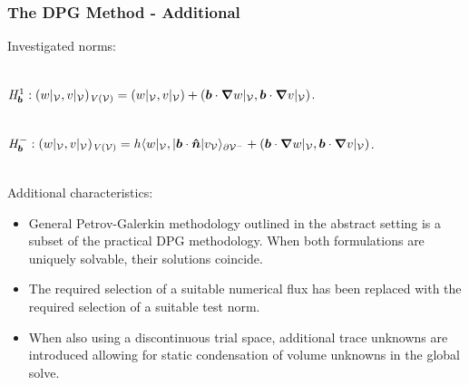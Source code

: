 \begin{frame}
\frametitle{The DPG Method - Additional}

Investigated norms:
\\~

$\fspace{H}^1_\varv{b}: (w|_{\fe{V}},v|_{\fe{V}})_{\fspace{V}(\fe{V})}
  = (w|_{\fe{V}},v|_{\fe{V}}) +(\varv{b} \cdot \nabla w|_{\fe{V}},\varv{b} \cdot \nabla v|_{\fe{V}})$.
\\~

$\fspace{H}^-_\varv{b}: (w|_{\fe{V}},v|_{\fe{V}})_{\fspace{V}(\fe{V})} =
  h \langle w|_{\fe{V}},|\varv{b} \cdot \varv{\hat{n}}| v_{\fe{V}} \rangle_{\partial \fe{V}^-} +(\varv{b} \cdot \nabla w|_{\fe{V}},\varv{b} \cdot \nabla v|_{\fe{V}})$.
\\~

Additional characteristics:
\begin{itemize}
  \item General Petrov-Galerkin methodology outlined in the abstract setting is
    a subset of the practical DPG methodology. When both formulations are
    uniquely solvable, their solutions coincide.
  \item The required selection of a suitable numerical flux has been replaced
    with the required selection of a suitable test norm.
  \item When also using a discontinuous trial space, additional trace unknowns
    are introduced allowing for static condensation of volume unknowns in the
    global solve.
\end{itemize}

\end{frame}
